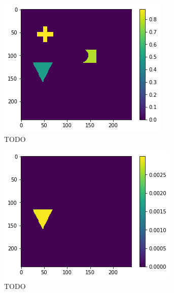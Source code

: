 \begin{figure}[H]
    \centering
    \begin{subfigure}[t]{.33\textwidth}
        \centering
        \includegraphics[width=\linewidth]{chapters/06_hdm/images_analyze/2a_masked.png}
        \caption{TODO}
    \end{subfigure}%
    \begin{subfigure}[t]{.33\textwidth}
        \centering
        \includegraphics[width=\linewidth]{chapters/06_hdm/images_analyze/2b_segment.png}
        \caption{TODO}
    \end{subfigure}
    \begin{subfigure}[t]{.33\textwidth}

\end{subfigure}
\end{figure}
